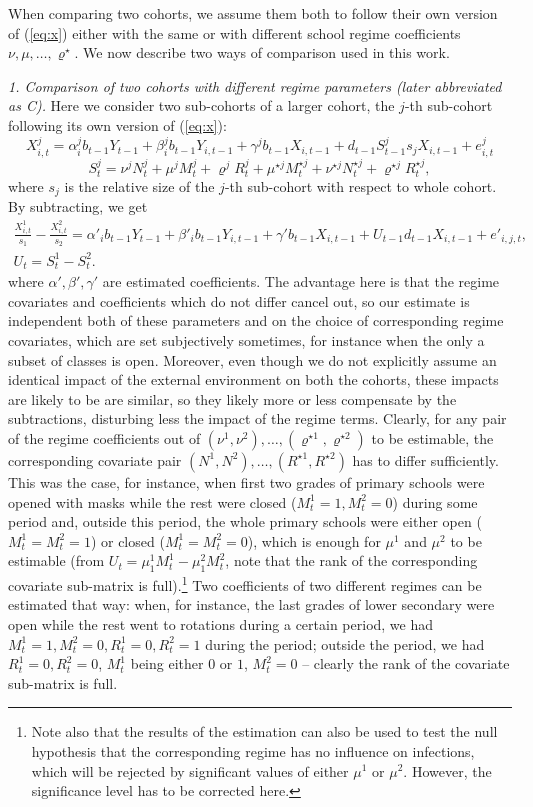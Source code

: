 \documentclass[fleqn,10pt]{wlscirep}
\begin{document}
When comparing two cohorts, we assume them both to follow their own version of (\ref{eq:x}) either with the same or with different school regime coefficients $\nu,\mu,\dots,\varrho^\star$.  We now describe two ways of comparison used in this work.

{\em 1. Comparison of two cohorts with different regime parameters (later abbreviated as C).} Here we consider two sub-cohorts of a larger cohort, the $j$-th sub-cohort following its own version of (\ref{eq:x}):
$$
X^j_{i,t} = \alpha^j_i b_{t-1} Y_{t-1} + \beta^j_i b_{t-1} Y_{i,t-1} + \gamma^j b_{t-1} X_{i,t-1}
+ d_{t-1} S^j_{t-1} s_j X_{i,t-1} + e^j_{i,t}
$$
$$
S^j_t = \nu^j N^j_{t} + \mu^j M^j_{t} + \varrho^j R^j_{t} + \mu^{\star j} M^{\star  j}_{t} + \nu^{\star j} N^{\star j}_{t} +  \varrho^{\star j} R^{\star j}_{t},
$$
where $s_j$ is the relative size of the $j$-th sub-cohort with respect to whole cohort. By subtracting, we get 
\begin{multline}
\frac{X^{1}_{i,t}}{s_{1}} - \frac{X^{2}_{i,t}}{s_{2}} = \alpha'_i b_{t-1} Y_{t-1} + \beta'_i b_{t-1} Y_{i,t-1} 
+ \gamma' b_{t-1} X_{i,t-1} + U_{t-1} d_{t-1} X_{i,t-1} + e'_{i,j,t},\\ U_t = S^1_t - S^2_t.
\label{eq:dif}
\end{multline}
where $\alpha', \beta', \gamma'$ are estimated coefficients. The advantage here is that the regime covariates and coefficients which do not differ cancel out, so our estimate is independent both of these parameters and on the choice of corresponding regime covariates, which are set subjectively sometimes, for instance when the only a subset of classes is open. Moreover, even though we do not explicitly assume an identical impact of the external environment on both the cohorts, these impacts are likely to be are similar, so they likely more or less compensate by the subtractions, disturbing less the impact of the regime terms. Clearly, for any pair of the regime coefficients out of $(\nu^1,\nu^2),\dots,(\varrho^{\star 1},\varrho^{\star 2})$ to be estimable, the corresponding covariate pair $(N^1,N^2),\dots,(R^{\star 1},R^{\star 2})$ has to differ sufficiently. This was the case, for instance, when first two grades of primary schools were opened with masks while the rest were closed ($M^1_t=1,M^2_t=0$) during some period and, outside this period, the whole primary schools were either open ($M^1_t = M^2_t = 1$) or closed ($M^1_t = M^2_t = 0$), which is enough for $\mu^1$ and $\mu^2$ to be estimable (from $U_t=\mu^1_1 M^1_t-\mu^2_1 M^2_t$, note that the rank of the corresponding covariate sub-matrix is full).\footnote{Note also that the results of the estimation can also be used to test the null hypothesis that the corresponding regime has no influence on infections, which will be rejected by significant values of either $\mu^{1}$ or $\mu^2$. However, the significance level has to be corrected here.} Two coefficients of two different regimes can be estimated that way: when, for instance, the last grades of lower secondary were open while the rest went to rotations during a certain period, we had $M^1_t=1, M^2_t=0, R^1_t=0, R^2_t=1$ during the period; outside the period, we had  $R^1_t=0, R^2_t=0$, $M^1_t$ being either $0$ or  $1$, $M^2_t=0$  -- clearly the rank of the covariate sub-matrix is full. 
\end{document}
